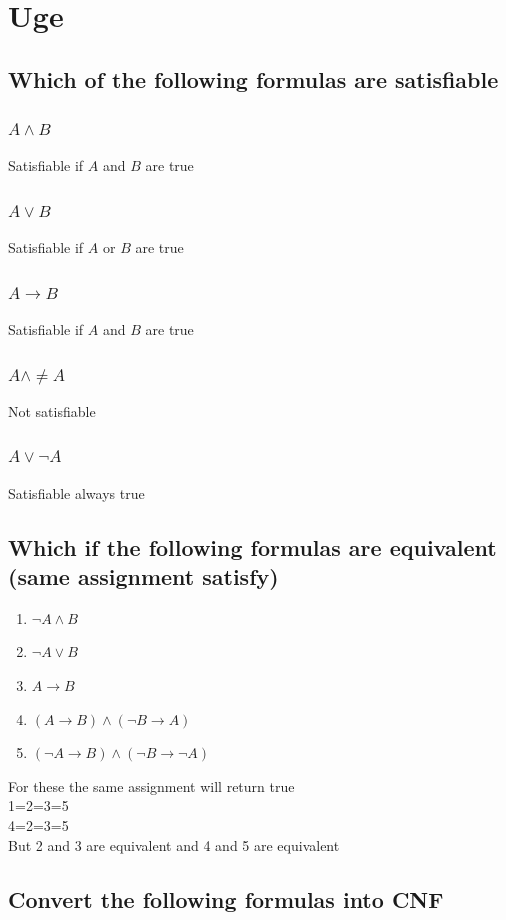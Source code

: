 \documentclass[12pt, a4paper]{article}
\begin{document}
	\section{Uge}
		\subsection{Which of the following formulas are satisfiable}	
			\subsubsection{$A\land B$}
				Satisfiable if $A$ and $B$ are true	
			\subsubsection{$A\lor B$}
				Satisfiable if $A$ or $B$ are true
			\subsubsection{$A\rightarrow B$}
				Satisfiable if $A$ and $B$ are true
			\subsubsection{$A\land \neq A$}
				Not satisfiable 
			\subsubsection{$A\lor \neg A$}
				Satisfiable always true
		\subsection{Which if the following formulas are equivalent (same assignment satisfy)}
			\begin{enumerate}
				\item $\neg A\land B$
				\item $\neg A\lor B$
				\item $A\rightarrow B$
				\item $(A\rightarrow B)\land (\neg B\rightarrow A)$
				\item $(\neg A\rightarrow B)\land (\neg B\rightarrow \neg A)$
			\end{enumerate}
				For these the same assignment will return true\\
				1=2=3=5\\
				4=2=3=5\\
				But 2 and 3 are equivalent and 4 and 5 are equivalent
		\subsection{Convert the following formulas into CNF}
\end{document}
